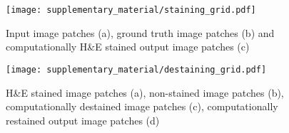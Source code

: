 \documentclass[10pt, conference, compsocconf]{IEEEtran}
\begin{document}
\balance



\onecolumn

\begin{figure}
  \begin{center}
    \texttt{[image: supplementary\_material/staining\_grid.pdf]}
    \caption{Input image patches (a), ground truth image patches (b) and computationally H\&E stained output image patches (c)}
    \label{supp_fig: staining_grid}
  \end{center}
\end{figure}

\begin{figure}
  \begin{center}
    \texttt{[image: supplementary\_material/destaining\_grid.pdf]}
    \caption{H\&E stained image patches (a), non-stained image patches (b), computationally destained image patches (c), computationally restained output image patches (d)}
    \label{supp_fig: destaining_grid}
  \end{center}
\end{figure}
\end{document}
